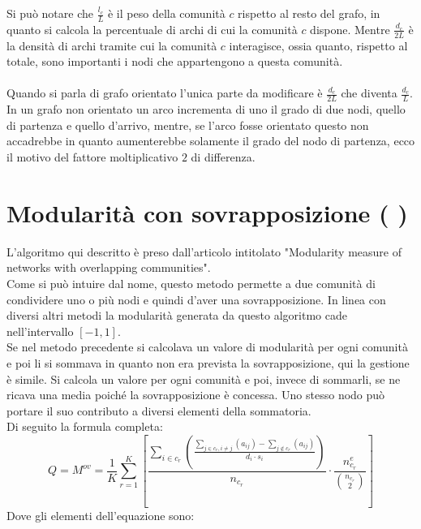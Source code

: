 %
Si può notare che $\frac{l_c}{L}$ è il peso della comunità $c$ rispetto al resto del grafo, in quanto si calcola la percentuale di archi di cui la comunità $c$ dispone. Mentre $\frac{d_c}{2L}$ è la densità di archi tramite cui la comunità $c$ interagisce, ossia quanto, rispetto al totale, sono importanti i nodi che appartengono a questa comunità.\\
\\
Quando si parla di grafo orientato l'unica parte da modificare è $\frac{d_c}{2L}$ che diventa $\frac{d_c}{L}$. In un grafo non orientato un arco incrementa di uno il grado di due nodi, quello  di partenza e quello d'arrivo, mentre, se l'arco fosse orientato questo non accadrebbe in quanto aumenterebbe solamente il grado del nodo di partenza, ecco il motivo del fattore moltiplicativo $2$ di differenza.
%
%
\section{Modularità con sovrapposizione ( \mover )}
L'algoritmo qui descritto è preso dall'articolo intitolato "Modularity measure of networks with overlapping communities"\cite{M-over_paper}.\\
Come si può intuire dal nome, questo metodo permette a due comunità di condividere uno o più nodi e quindi d'aver una sovrapposizione. In linea con diversi altri metodi la modularità generata da questo algoritmo cade nell'intervallo $[-1, 1]$.\\
Se nel metodo precedente si calcolava un valore di modularità per ogni comunità e poi li si sommava in quanto non era prevista la sovrapposizione, qui la gestione è simile. Si calcola un valore per ogni comunità e poi, invece di sommarli, se ne ricava una media poiché la sovrapposizione è concessa. Uno stesso nodo può portare il suo contributo a diversi elementi della sommatoria.\\
Di seguito la formula completa:
\begin{equation}
	Q = M^{ov} = \frac{1}{K} 
	\sum_{r=1}^{K} \left[
		\frac
			{\sum\limits_{i \in c_r} 
				\left( \frac
					{
						\sum\limits_{j \in c_r, i \neq j} \left( a_{ij} \right) 
						- 
						\sum\limits_{j \notin c_r} \left( a_{ij} \right) 
					} 
					{d_i \cdot s_i} 
				\right) } 
			{n_{c_r}}
		\cdot
		\frac{ n^e_{c_r} }{ \binom{n_{c_r}}{2} } 
	\right]
	\label{eq:m_over}
\end{equation}
Dove gli elementi dell'equazione sono:
